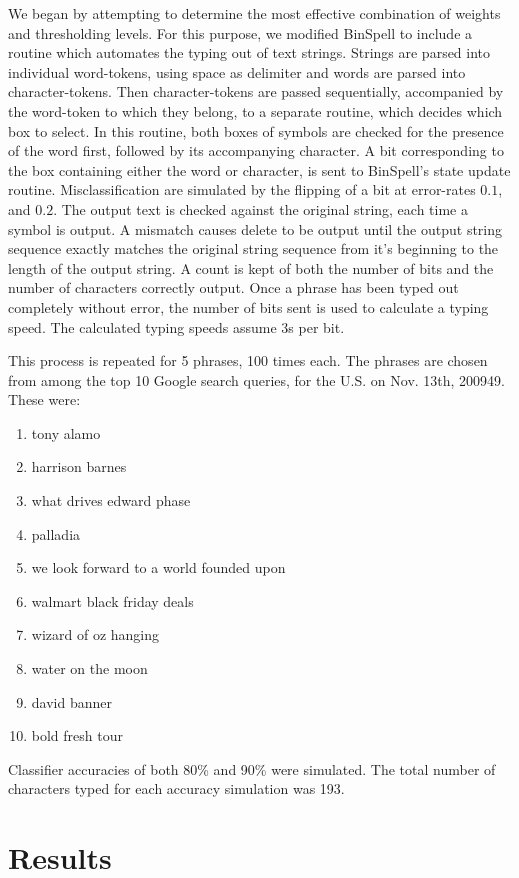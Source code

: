 \documentclass[12pt,titlepage]{article}
\begin{document}
We began by attempting to determine the most effective combination of weights and 
thresholding levels.  For this purpose, we modified BinSpell to include a routine which 
automates the typing out of text strings.  Strings are parsed  into individual word-tokens, using 
space as delimiter and words are parsed into character-tokens.  Then character-tokens are 
passed sequentially, accompanied by the word-token to which they belong, to a separate routine, which decides which box to select.  In this routine, both boxes of 
symbols are checked for the presence of the word first, followed by its accompanying 
character.  A bit corresponding to the box containing either the word or character, is sent to BinSpell's state update routine. 
Misclassification are simulated by the flipping of a bit at error-rates $0.1$, and $0.2$.  The output text is checked against the original string, each time a symbol is output.  A mismatch causes delete to be output until the output string sequence exactly matches the original string sequence from it's beginning to the length of the output string.  A count is 
kept of both the number of bits and the number of characters correctly output.  Once a phrase 
has been typed out completely without error, the number of bits sent is used to calculate a 
typing speed.  The calculated typing speeds assume 3s per bit.

This process is repeated for 5 phrases, 100 times each.  The phrases are chosen from  among 
the top 10 Google search queries, for the  U.S. on Nov. 13th, 200949.  These were: 
\begin{enumerate}
\item tony alamo 
\item harrison barnes 
\item what drives edward phase 
\item palladia 
\item we look forward to a world founded upon 
\item walmart black friday deals 
\item wizard of oz hanging 
\item water on the moon 
\item david banner 
\item bold fresh tour
\end{enumerate}

Classifier accuracies of both 80\% and 90\% were simulated.  The total number of characters 
typed for each accuracy simulation was 193.

\section{Results}
\end{document}
